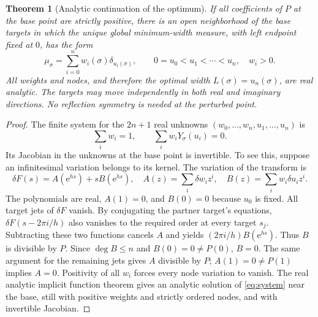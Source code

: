 \documentclass[11pt]{article}
\newtheorem{theorem}{Theorem}[section]
\theoremstyle{remark}\newtheorem{remark}[theorem]{Remark}
\newcommand{\e}{\mathrm e}\newcommand{\norm}[1]{\left\|#1\right\|}
\begin{document}
\begin{theorem}[Analytic continuation of the optimum]\label{thm:perturb}
If all coefficients of $P$ at the base point are strictly positive, there is an open neighborhood of the base targets in which the unique global minimum-width measure, with left endpoint fixed at $0$, has the form
\[
 \mu_\sigma=\sum_{i=0}^n w_i(\sigma)\delta_{u_i(\sigma)},\qquad
 0=u_0<u_1<\cdots<u_n,\quad w_i>0.
\]
All weights and nodes, and therefore the optimal width $L(\sigma)=u_n(\sigma)$, are real analytic. The targets may move independently in both real and imaginary directions. No reflection symmetry is needed at the perturbed point.
\end{theorem}
\begin{proof}
The finite system for the $2n+1$ real unknowns $(w_0,\ldots,w_n,u_1,\ldots,u_n)$ is
\begin{equation}\label{eq:system}
 \sum_i w_i=1,\qquad \sum_i w_iY_\sigma(u_i)=0.
\end{equation}
Its Jacobian in the unknowns at the base point is invertible. To see this, suppose an infinitesimal variation belongs to its kernel. The variation of the transform is
\[
 \delta F(s)=A(\e^{hs})+s B(\e^{hs}),\quad
 A(z)=\sum_i\delta w_i z^i,\quad B(z)=\sum_i w_i\delta u_i z^i.
\]
The polynomials are real, $A(1)=0$, and $B(0)=0$ because $u_0$ is fixed. All target jets of $\delta F$ vanish. By conjugating the partner target's equations, $\delta F(s-2\pi i/h)$ also vanishes to the required order at every target $s_j$. Subtracting these two functions cancels $A$ and yields $(2\pi i/h)B(\e^{hs})$. Thus $B$ is divisible by $P$. Since $\deg B\le n$ and $B(0)=0\ne P(0)$, $B=0$. The same argument for the remaining jets gives $A$ divisible by $P$; $A(1)=0\ne P(1)$ implies $A=0$. Positivity of all $w_i$ forces every node variation to vanish. The real analytic implicit function theorem gives an analytic solution of \eqref{eq:system} near the base, still with positive weights and strictly ordered nodes, and with invertible Jacobian.


\end{proof}
\end{document}

